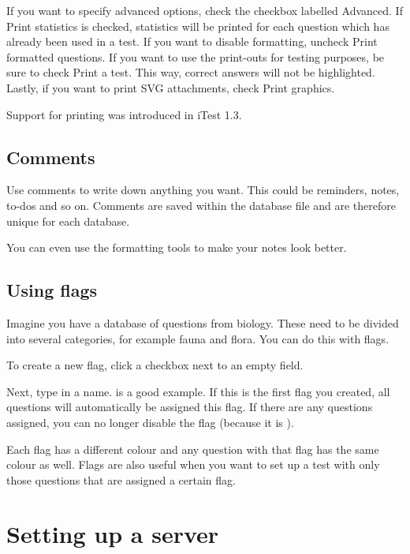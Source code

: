 If you want to specify advanced options, check the checkbox labelled Advanced.
If Print statistics is checked, statistics will be printed for each question which has already been used in a test.
If you want to disable formatting, uncheck Print formatted questions.
If you want to use the print-outs for testing purposes, be sure to check Print a test.
This way, correct answers will not be highlighted.
Lastly, if you want to print SVG attachments, check Print graphics.

Support for printing was introduced in iTest 1.3.

\subsection{Comments}

Use comments to write down anything you want.
This could be reminders, notes, to-dos and so on.
Comments are saved within the database file and are therefore unique for each database.

You can even use the formatting tools to make your notes look better.


\subsection{Using flags}

Imagine you have a database of questions from biology.
These need to be divided into several categories, for example fauna and flora.
You can do this with flags.

To create a new flag, click a checkbox next to an empty field.


Next, type in a name.  is a good example.
If this is the first flag you created, all questions will automatically be assigned this flag.
If there are any questions assigned, you can no longer disable the flag (because it is ).


Each flag has a different colour and any question with that flag has the same colour as well.
Flags are also useful when you want to set up a test with only those questions that are assigned a certain flag.

\section{Setting up a server}

